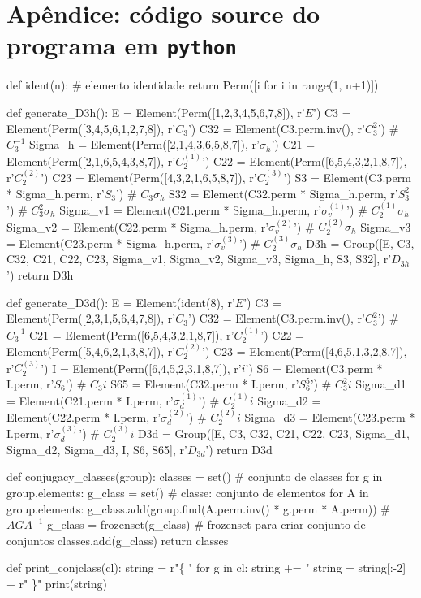 \documentclass[a4paper,10pt]{article}
\newcommand{\python}[1]{\texttt{#1}}
\begin{document}
\section*{Apêndice: código source do programa em \python{python}}

\begin{Python}
def ident(n):   # elemento identidade
    return Perm([i for i in range(1, n+1)])

def generate_D3h():
    E = Element(Perm([1,2,3,4,5,6,7,8]), r'$E$')
    C3 = Element(Perm([3,4,5,6,1,2,7,8]), r'$C_3$')
    C32 = Element(C3.perm.inv(), r'$C_3^2$')                            # $C_3^{-1}$
    Sigma_h = Element(Perm([2,1,4,3,6,5,8,7]), r'$\sigma_h$')
    C21 = Element(Perm([2,1,6,5,4,3,8,7]), r'$C_2^{(1)}$')
    C22 = Element(Perm([6,5,4,3,2,1,8,7]), r'$C_2^{(2)}$')
    C23 = Element(Perm([4,3,2,1,6,5,8,7]), r'$C_2^{(3)}$')
    S3 = Element(C3.perm * Sigma_h.perm, r'$S_3$')                      # $C_3 \sigma_h$
    S32 = Element(C32.perm * Sigma_h.perm, r'$S_3^2$')                  # $C_3^2 \sigma_h$
    Sigma_v1 = Element(C21.perm * Sigma_h.perm, r'$\sigma_v^{(1)}$')    # $C_2^{(1)} \sigma_h$
    Sigma_v2 = Element(C22.perm * Sigma_h.perm, r'$\sigma_v^{(2)}$')    # $C_2^{(2)} \sigma_h$
    Sigma_v3 = Element(C23.perm * Sigma_h.perm, r'$\sigma_v^{(3)}$')    # $C_2^{(3)} \sigma_h$
    D3h = Group([E, C3, C32, C21, C22, C23, Sigma_v1,
                 Sigma_v2, Sigma_v3, Sigma_h, S3, S32], r'$D_{3h}$')
    return D3h

def generate_D3d():
    E = Element(ident(8), r'$E$')
    C3 = Element(Perm([2,3,1,5,6,4,7,8]), r'$C_3$')
    C32 = Element(C3.perm.inv(), r'$C_3^2$')                    # $C_3^{-1}$
    C21 = Element(Perm([6,5,4,3,2,1,8,7]), r'$C_2^{(1)}$')
    C22 = Element(Perm([5,4,6,2,1,3,8,7]), r'$C_2^{(2)}$')
    C23 = Element(Perm([4,6,5,1,3,2,8,7]), r'$C_2^{(3)}$')
    I = Element(Perm([6,4,5,2,3,1,8,7]), r'$i$')
    S6 = Element(C3.perm * I.perm, r'$S_6$')                    # $C_3 i$
    S65 = Element(C32.perm * I.perm, r'$S_6^5$')                # $C_3^2 i$
    Sigma_d1 = Element(C21.perm * I.perm, r'$\sigma_d^{(1)}$')  # $C_2^{(1)} i$
    Sigma_d2 = Element(C22.perm * I.perm, r'$\sigma_d^{(2)}$')  # $C_2^{(2)} i$
    Sigma_d3 = Element(C23.perm * I.perm, r'$\sigma_d^{(3)}$')  # $C_2^{(3)} i$
    D3d = Group([E, C3, C32, C21, C22, C23,
                 Sigma_d1, Sigma_d2, Sigma_d3, I, S6, S65], r'$D_{3d}$')
    return D3d

def conjugacy_classes(group):
    classes = set()     # conjunto de classes
    for g in group.elements:
        g_class = set() # classe: conjunto de elementos
        for A in group.elements:
            g_class.add(group.find(A.perm.inv() * g.perm * A.perm)) # $A G A^{-1}$
        g_class = frozenset(g_class)  # frozenset para criar conjunto de conjuntos
        classes.add(g_class)
    return classes

def print_conjclass(cl):
    string = r"\{ "
    for g in cl:
        string += "%
    string = string[:-2] + r" \}"
    print(string)
\end{Python}
\end{document}
